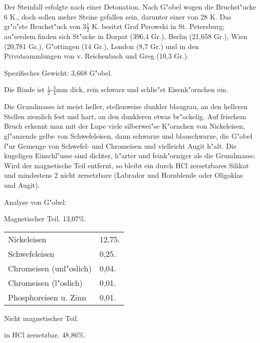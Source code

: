 \documentclass[a4paper, 11pt, oneside]{article}
\begin{document}
Der Steinfall erfolgte nach einer Detonation. Nach G"obel wogen die Bruchst"ucke 6 K., doch sollen mehre Steine gefallen sein, darunter einer von 28 K. Das gr"o"ste Bruchst"uck von $3\frac{1}{2}$ K. besitzt Graf Perowski in St. Petersburg; au"serdem finden sich St"ucke in Dorpat (396,4 Gr.), Berlin (21,658 Gr.), Wien (20,781 Gr.), G"ottingen (14 Gr.), London (8,7 Gr.) und in den Privatsammlungen von v. Reichenbach und Greg (10,3 Gr.).

Spezifisches Gewicht: 3,668 G"obel.

Die Rinde ist $\frac{1}{2}$-$\frac{3}{4}$mm dick, rein schwarz und schlie"st Eisenk"ornchen ein.

Die Grundmasse ist meist heller, stellenweise dunkler blaugrau, an den helleren Stellen ziemlich fest und hart, an den dunkleren etwas br"ockelig. Auf frischem Bruch erkennt man mit der Lupe viele silberwei"se K"ornchen von Nickeleisen, gl"anzende gelbe von Schwefeleisen, dann schwarze und blauschwarze, die G"obel f"ur Gemenge von Schwefel- und Chromeisen und vielleicht Augit h"alt. Die kugeligen Einschl"usse sind dichter, h"arter und feink"orniger als die Grundmasse. Wird der magnetische Teil entfernt, so bleibt ein durch HCl zersetzbares Silikat und mindestens 2 nicht zersetzbare (Labrador und Hornblende oder Oligoklas und Augit).

Analyse von G"obel:
\begin{center}
Magnetischer Teil. 13,07\%.
\end{center}

\begin{table}[H]
    \centering
    \begin{tabular}{l l}
        \hline
        Nickeleisen & 12,75. \\
        Schwefeleisen & 0,25. \\
        Chromeisen (unl"oslich) & 0,04. \\
        Chromeisen (l"oslich) & 0,01. \\
        Phosphoreisen u. Zinn  & 0,01. \\
    \end{tabular}
\end{table}

\begin{center}
Nicht magnetischer Teil.
\end{center}

\begin{center}
in HCl zersetzbar. 48,86\%.
\end{center}
\end{document}
